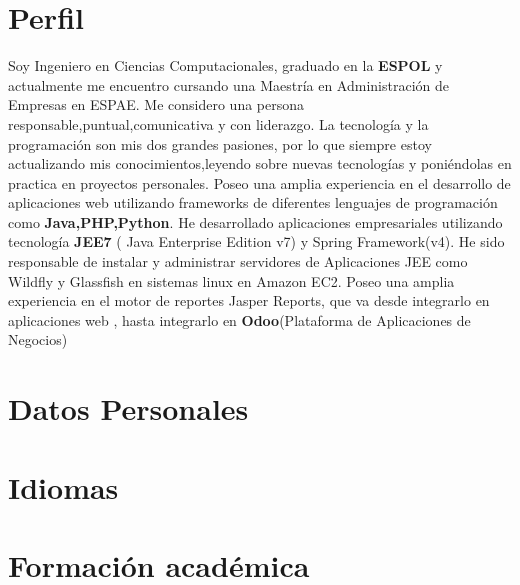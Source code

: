 \documentclass[11pt,a4paper,sans]{moderncv}   %
\begin{document}
\renewcommand*\namefont{\fontsize{22}{48}\selectfont}
\maketitle

\section{Perfil}
Soy Ingeniero en Ciencias Computacionales, graduado en la \textbf{ESPOL} y actualmente me encuentro cursando una Maestría en Administración de Empresas en ESPAE. Me considero una persona responsable,puntual,comunicativa y con liderazgo. La tecnología y la programación son mis dos grandes pasiones, por lo que siempre estoy actualizando mis conocimientos,leyendo sobre nuevas tecnologías y poniéndolas en practica en proyectos personales. Poseo una amplia experiencia en el  desarrollo de aplicaciones web utilizando  frameworks de diferentes lenguajes de programación como \textbf{Java,PHP,Python}.
He desarrollado aplicaciones empresariales utilizando tecnología \textbf{JEE7} ( Java Enterprise Edition v7) y Spring Framework(v4).
He sido responsable de instalar y administrar servidores de Aplicaciones JEE como Wildfly y Glassfish en sistemas linux en Amazon EC2.
Poseo una amplia experiencia en el motor de reportes Jasper Reports, que va desde integrarlo en aplicaciones web , hasta integrarlo en \textbf{Odoo}(Plataforma de Aplicaciones de Negocios)





\section{Datos Personales}


\section{Idiomas}


\section{Formaci\'on acad\'emica}
\end{document}
